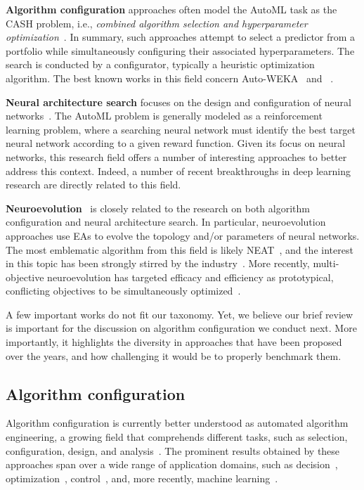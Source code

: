 \textbf{Algorithm configuration} approaches often model the AutoML task as the CASH problem, i.e., \emph{combined algorithm selection and hyperparameter optimization}~\cite{autoweka}. In summary, such approaches attempt to select a predictor from a portfolio while simultaneously configuring their associated hyperparameters. The search is conducted by a configurator, typically a heuristic optimization algorithm. The best known works in this field concern Auto-WEKA~\cite{autoweka} and \autosklearn~\cite{auto-sklearn}.

\textbf{Neural architecture search} focuses on the design and configuration of neural networks~\cite{ElsMetHut2019nas-survey}. The AutoML problem is generally modeled as a reinforcement learning problem, where a searching neural network must identify the best target neural network according to a given reward function. Given its focus on neural networks, this research field offers a number of interesting approaches to better address this context.
Indeed, a number of recent breakthroughs in deep learning research are directly related to this field.

\textbf{Neuroevolution}~\cite{StaMii2002neat,google-evonn,LuWhaBodDheDebGooBan2019nsganet} is closely related to the research on both algorithm configuration and neural architecture search. In particular, neuroevolution approaches use EAs to evolve the topology and/or parameters of neural networks. The most emblematic algorithm from this field is likely NEAT~\cite{StaMii2002neat}, and the interest in this topic has been strongly stirred by the industry~\cite{google-evonn}. More recently, multi-objective neuroevolution has targeted efficacy and efficiency as prototypical, conflicting objectives to be simultaneously optimized~\cite{LuWhaBodDheDebGooBan2019nsganet}.

A few important works do not fit our taxonomy. Yet, we believe our brief review is important for the discussion on algorithm configuration we conduct next. More importantly, it highlights the diversity in approaches that have been proposed over the years, and how challenging it would be to properly benchmark them.

\subsection{Algorithm configuration}

Algorithm configuration is currently better understood as automated algorithm engineering, a growing field that comprehends different tasks, such as selection, configuration, design, and analysis~\cite{BezerraPhD}. The prominent results obtained by these approaches span over a wide range of application domains, such as decision~\cite{khudabukhsh2016satenstein}, optimization~\cite{BezerraPhD}, control~\cite{hasselmann2018automatic}, and, more recently, machine learning~\cite{autoweka,auto-sklearn}. 

